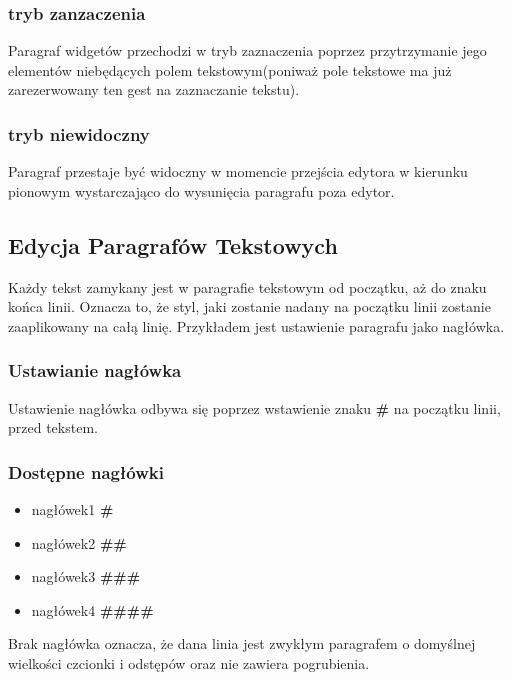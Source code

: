 \documentclass[shortabstract]{iithesis}
\begin{document}
\subsubsection{tryb zanzaczenia}

Paragraf widgetów przechodzi w tryb zaznaczenia poprzez przytrzymanie jego elementów niebędących polem tekstowym(poniważ pole tekstowe ma już zarezerwowany ten gest na zaznaczanie tekstu).

\subsubsection{tryb niewidoczny}

Paragraf przestaje być widoczny w momencie przejścia edytora w kierunku pionowym wystarczająco do wysunięcia paragrafu poza edytor.

\pagebreak

\subsection{Edycja Paragrafów Tekstowych}

Każdy tekst zamykany jest w paragrafie tekstowym od początku, aż do znaku końca linii. Oznacza to, że styl, jaki zostanie nadany na początku linii zostanie zaaplikowany na całą linię. Przykładem jest ustawienie paragrafu jako nagłówka.

\subsubsection{Ustawianie nagłówka}

Ustawienie nagłówka odbywa się poprzez wstawienie znaku \textbf{\#} na początku linii, przed tekstem.

\subsubsection{Dostępne nagłówki}
\begin{itemize}
    \setlength\itemsep{0mm}
    \item nagłówek1 \textbf{\#}
    \item nagłówek2 \textbf{\#\#}
    \item nagłówek3 \textbf{\#\#\#}
    \item nagłówek4 \textbf{\#\#\#\#}
\end{itemize}

Brak nagłówka oznacza, że dana linia jest zwykłym paragrafem o domyślnej wielkości czcionki i odstępów oraz nie zawiera pogrubienia.
\end{document}
